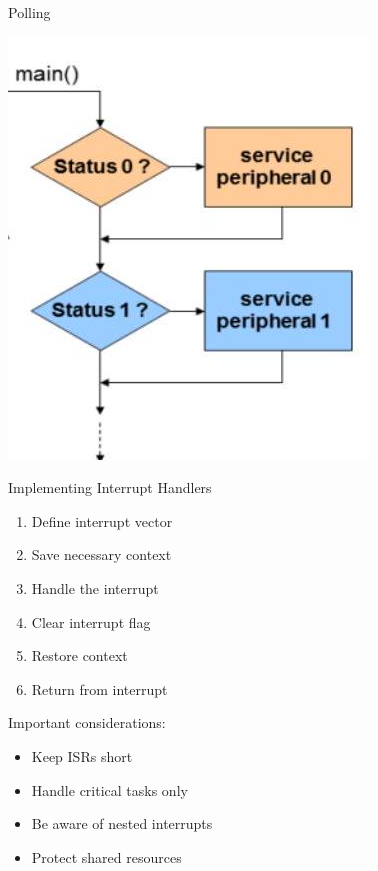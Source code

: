 \begin{concept}{Polling}
\begin{minipage}{0.39\linewidth}
\includegraphics[width=\linewidth]{images/2024_12_29_79e6b22f503fb7b4f718g-11(1)}
\end{minipage}
\end{concept}

\begin{KR}{Implementing Interrupt Handlers}

\begin{minipage}{0.5\linewidth}
\begin{enumerate}
  \item Define interrupt vector
  \item Save necessary context
  \item Handle the interrupt
  \item Clear interrupt flag
  \item Restore context
  \item Return from interrupt
\end{enumerate}
\end{minipage}
\begin{minipage}{0.49\linewidth}
Important considerations:
\begin{itemize}
  \item Keep ISRs short
  \item Handle critical tasks only
  \item Be aware of nested interrupts
  \item Protect shared resources
\end{itemize}
\end{minipage}
\end{KR}

